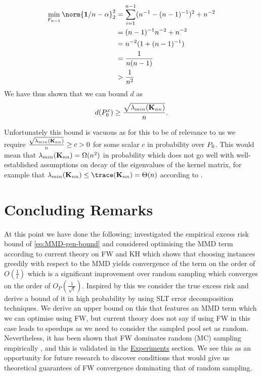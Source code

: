 \begin{align*}
  \min_{F_{n-1}}\norm{\mathbf{1}/n - \mat{\alpha}}_{2}^2 & = \sum_{i=1}^{n-1}(n^{-1} - (n-1)^{-1})^{2} + n^{-2} \\
                                                         & = (n-1)^{-1}n^{-2} + n^{-2} \\
                                                         & = n^{-2}(1 + (n-1)^{-1}) \\
                                                         & = \frac{1}{n(n-1)} \\
                                                         & > \frac{1}{n^{2}}
\end{align*}
We have thus shown that we can bound \(d\) as
\begin{equation}
  \label{eq:lower-bound-on-d}
  d(P^x_{0}) \geq \frac{\sqrt{\lambda_{min}(\mathbf{K}_{nn})}}{n}.
\end{equation}

Unfortunately this bound is vacuous as for this to be of relevance to us we
require \(\frac{\sqrt{\lambda_{min}(\mathbf{K}_{nn})}}{n} \geq c > 0\) for some
scalar \(c\) in probability over \(P_{0}\). This would mean that
\(\lambda_{min}(\mathbf{K}_{nn}) = \Omega(n^{2})\) in probability which does not go
well with well-established assumptions on decay of the eigenvalues of the kernel
matrix, for example that \(\lambda_{min}(\mat{K}_{nn}) \leq \trace(\mat{K}_{nn})
= \Theta(n)\) according to \cite{bach13_sharp}.

\section{Concluding Remarks}
At this point we have done the following; investigated the empirical excess risk
bound of \ref{eq:MMD-gen-bound} and considered optimising the MMD term
according to current theory on FW and KH which shows that choosing instances greedily
with respect to the MMD yields convergence of the term on the order of
\(O(\frac{1}{t})\) which is a significant improvement over random sampling which
converges on the order of \(O_P(\frac{1}{\sqrt{t}})\). Inspired by this we consider
the true excess risk and derive a bound of it in high probability by using SLT
error decomposition techniques. We derive an upper bound on this that features
an MMD term which we can optimise using FW, but current theory does not say if
using FW in this case leads to speedups as we need to consider the sampled
pool set as random. Nevertheless, it has been shown that FW dominates random
(MC) sampling empirically \cite{bach12_equiv_between_herdin_condit_gradien_algor},
and this is validated in the \hyperref[ch:experiments]{Experiments} section. We
see this as an opportunity for future research to discover conditions that would
give us theoretical guarantees of FW convergence dominating that of random sampling.
